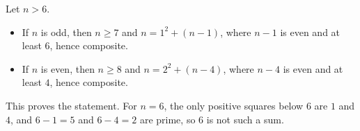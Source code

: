 Let $n>6$.
\begin{itemize}
\item If $n$ is odd, then $n\ge7$ and $n=1^2+(n-1)$, where $n-1$ is even and at least $6$, hence composite.
\item If $n$ is even, then $n\ge8$ and $n=2^2+(n-4)$, where $n-4$ is even and at least $4$, hence composite.
\end{itemize}
This proves the statement. For $n=6$, the only positive squares below $6$ are $1$ and $4$, and $6-1=5$ and $6-4=2$ are prime, so $6$ is not such a sum.
